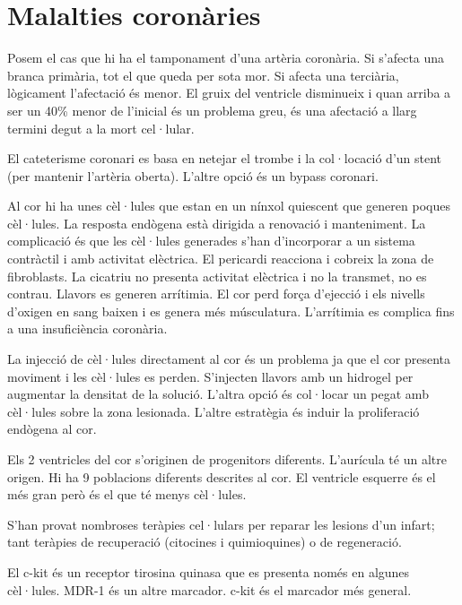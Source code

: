 \section{Malalties coronàries}

Posem el cas que hi ha el tamponament d'una artèria coronària. Si s'afecta una branca primària, tot el que queda per sota mor. Si afecta una terciària, lògicament l'afectació és menor. El gruix del ventricle disminueix i quan arriba a ser un 40\% menor de l'inicial és un problema greu, és una afectació a llarg termini degut a la mort cel·lular.

El cateterisme coronari es basa en netejar el trombe i la col·locació d'un stent (per mantenir l'artèria oberta). L'altre opció és un bypass coronari.

Al cor hi ha unes cèl·lules que estan en un nínxol quiescent que generen poques cèl·lules. La resposta endògena està dirigida a renovació i manteniment. La complicació és que les cèl·lules generades s'han d'incorporar a un sistema contràctil i amb activitat elèctrica. El pericardi reacciona i cobreix la zona de fibroblasts. La cicatriu no presenta activitat elèctrica i no la transmet, no es contrau. Llavors es generen arrítimia. El cor perd força d'ejecció i els nivells d'oxigen en sang baixen i es genera més músculatura. L'arrítimia es complica fins a una insuficiència coronària.

La injecció de cèl·lules directament al cor és un problema ja que el cor presenta moviment i les cèl·lules es perden. S'injecten llavors amb un hidrogel per augmentar la densitat de la solució. L'altra opció és col·locar un pegat amb cèl·lules sobre la zona lesionada. L'altre estratègia és induir la proliferació endògena al cor.

Els 2 ventricles del cor s'originen de progenitors diferents. L'aurícula té un altre origen. Hi ha 9 poblacions diferents descrites al cor. El ventricle esquerre és el més gran però és el que té menys cèl·lules.

S'han provat nombroses teràpies cel·lulars per reparar les lesions d'un infart; tant teràpies de recuperació  (citocines i quimioquines) o de regeneració.

El c-kit és un receptor tirosina quinasa que es presenta només en algunes cèl·lules. MDR-1 és un altre marcador. c-kit és el marcador més general.


